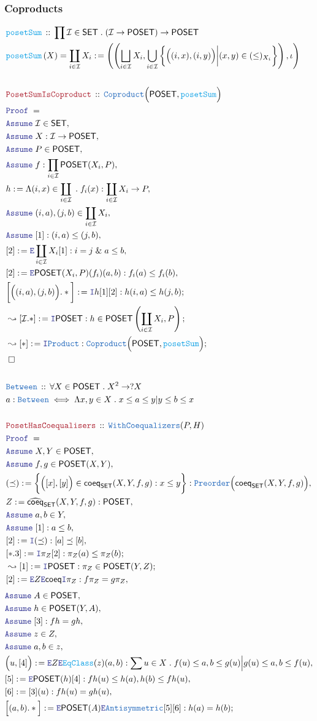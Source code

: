 \documentclass[12pt]{scrartcl}
\newcommand{\TYPE}[1]{\textcolor{NavyBlue}{\mathtt{#1}}}
\newcommand{\FUNC}[1]{\textcolor{Cerulean}{\mathtt{#1}}}
\newcommand{\LOGIC}[1]{\textcolor{Blue}{\mathtt{#1}}}
\newcommand{\THM}[1]{\textcolor{Maroon}{\mathtt{#1}}}
\renewcommand{\.}{\; . \;}
\newcommand{\de}{: \kern 0.1pc =}
\newcommand{\Act}[1]{\left( #1 \right)}
\newcommand{\Theorem}[2]{& \THM{#1} \, :: \, #2 \\ & \Proof = \\ }
\newcommand{\DeclareType}[2]{& \TYPE{#1} \, :: \, #2 \\}
\newcommand{\DefineType}[3]{& #1 : \TYPE{#2} \iff #3 \\}
\newcommand{\DeclareFunc}[2]{& \FUNC{#1} \, :: \, #2 \\}
\newcommand{\DefineNamedFunc}[4]{&  \FUNC{#1}\Act{#2} = #3 \de #4 \\}
\newcommand{\Page}[1]{ \begin{align*} #1 \end{align*}   }
\renewcommand{\And}{\; \& \;}
\newcommand{\Intro}{\LOGIC{I}}
\newcommand{\Elim}{\LOGIC{E}}
\newcommand{\Say}[3]{& #1 \de #2 : #3, \\}
\newcommand{\Conclude}[3]{& #1 \de #2 : #3; \\}
\newcommand{\DeriveConclude}[3]{& \leadsto #1 \de #2 : #3 ; \\}
\newcommand{\Assume}[2]{& \LOGIC{Assume} \; #1 : #2, \\}
\newcommand{\AssumeIn}[2]{& \LOGIC{Assume} \; #1 \in #2, \\}
\newcommand{\QED}{\; \square}
\newcommand{\EndProof}{& \QED \\}
\newcommand{\Proof}{\LOGIC{Proof} \; }
\newcommand{\I}{\mathcal{I}}
\newcommand{\SET}{\mathsf{SET}}
\newcommand{\POSET}{\mathsf{POSET}}
\begin{document}
\subsubsection{Coproducts}
\Page{
	\DeclareFunc{posetSum}{\prod \I \in \SET \. (\I \to \POSET) \to \POSET}
	\DefineNamedFunc{posetSum}{X}{\coprod_{i \in \I} X_i}
	{ 
		\left(
		\left( 
			\bigsqcup_{i \in \I} X_i, 
			\bigcup_{i \in \I} \bigg\{ \Big( (i,x), (i,y) \Big) \bigg| (x,y) \in (\le)_{X_i}  \bigg\} 
		\right), \iota
		\right)
	}
	\\
	\Theorem{PosetSumIsCoproduct}{\TYPE{Coproduct}\Big( \POSET, \FUNC{posetSum}  \Big)}
	\AssumeIn{\I}{\SET}
	\Assume{X}{\I \to \POSET}
	\AssumeIn{P}{\POSET}
	\Assume{f}{\prod_{i \in \I} \POSET(X_i,P)  }
	\Say{h}{ \Lambda (i,x) \in \coprod_{i \in \I} \.  f_i ( x  ) }
	{ 
		\coprod_{i \in \I} X_i \to P
	}
	\AssumeIn{(i,a),(j,b)}{\coprod_{i \in \I} X_i}
	\Assume{[1]}{(i,a) \le (j,b)}
	\Say{[2]}{\Elim \coprod_{i \in \I} X_i [1] }
	{
		i = j \And a \le b
	}
	\Say{[2]}{ \Elim \POSET(X_i,P)(f_i)(a,b) }
	{
		f_i(a) \le f_i(b)
	}
	\Conclude{\bigg[\Big((i,a),(j,b)\Big).*\bigg]}{\Intro h [1][2]}
	{
		h(i,a) \le h(j,b)
	}
	\DeriveConclude{[\I.*]}{\Intro \POSET}
	{
		h \in \POSET\left( \coprod_{i \in \I} X_i, P \right)
	}
	\DeriveConclude{[*]}{\Intro \TYPE{Product}}
	{
		\TYPE{Coproduct}\Big(\POSET, \FUNC{posetSum}  \Big)
	}
	\EndProof
	\\
	\DeclareType{Between}{
		\forall X \in \POSET \.
		X^2 \to ?X
	}
	\DefineType{a}{Between}{\Lambda x,y \in X \. x \le a \le y | y \le b \le x}
	\\
	\Theorem{PosetHasCoequalisers}{
		\TYPE{WithCoequalizers}(P,H)
	}
	\AssumeIn{X,Y}{\POSET}
	\AssumeIn{f,g}{\POSET(X,Y)}
	\Say{(\preceq)}{\bigg\{ \Big( [x],[y] \Big) \in \mathsf{coeq}_\SET(X,Y,f,g)  :  x \le y  \bigg\}}
	{
		\TYPE{Preorder}\Big(\mathsf{coeq}_\SET(X,Y,f,g)\Big)
	}
	\Say{Z}{\widehat{\mathsf{coeq}}_\SET(X,Y,f,g)}{\POSET}
	\AssumeIn{a,b}{Y}
	\Assume{[1]}{a \le b}
	\Say{[2]}{\Intro (\preceq)}{[a] \preceq [b]}
	\Conclude{[*.3]}{\Intro \pi_Z[2]}{\pi_Z(a) \le \pi_Z(b)}
	\DeriveConclude{[1]}{\Intro \POSET}{\pi_Z \in \POSET(Y,Z)}
	\Say{[2]}{\Elim Z \Elim \mathsf{coeq} \Intro \pi_Z}{f\pi_Z = g\pi_Z}
}\Page{
	\AssumeIn{A}{\POSET}
	\AssumeIn{h}{\POSET(Y,A)}
	\Assume{[3]}{fh = gh}
	\AssumeIn{z}{Z}
	\AssumeIn{a,b}{z}
	\Say{\Big(u,[4]\Big)}{\Elim Z \Elim \FUNC{EqClass}(z) (a,b)}
	{
		\sum u \in X \.  f(u) \le  a,b  \le g(u) \Big|  g(u) \le a,b \le f(u)
	}
	\Say{[5]}{\Elim \POSET(h)[4]}{fh(u) \le h(a),h(b) \le fh(u)}
	\Say{[6]}{[3](u)}{fh(u) = gh(u)}
	\Conclude{ \Big[ (a,b).*\Big]}{\Elim \POSET(A) \Elim \TYPE{Antisymmetric}[5][6]}{ h(a) = h(b) } 
}
\end{document}
